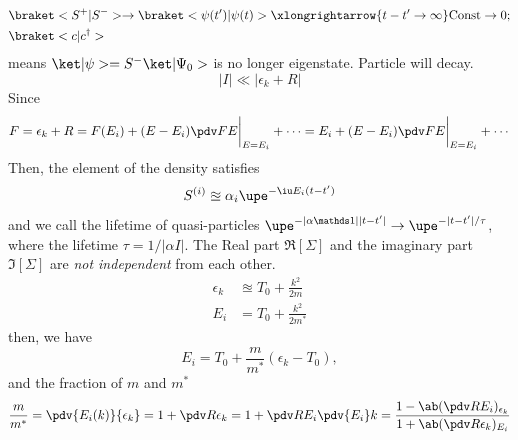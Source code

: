 \begin{align*}
  & \braket<S^+|S^-> \to \braket<\psi(t')|\psi(t)>
  \xlongrightarrow{t-t'\to\infty} \text{Const} \to 0;\\
  & \braket<c|c^\dagger>
\end{align*}
means $\ket|\psi> = S^-\ket|\Psi_0>$ is no longer eigenstate.
Particle will decay.
\[
  |I| \ll |\epsilon_k + R|
\]
Since
\[
  F = \epsilon_k + R
= F(E_i) + (E - E_i)\pdv FE\bigg|_{E=E_i} + \cdots
= E_i + (E - E_i)\pdv FE\bigg|_{E=E_i} + \cdots
\]
Then, the element of the density satisfies
\begin{equation}
  S^{(i)} \approxeq \alpha_i \upe^{-\iu E_i(t-t')}
\end{equation}
and we call the lifetime of quasi-particles $\upe^{-|\alpha \identity||t-t'|} \to \upe^{-|t-t'|/\tau}$, where the lifetime $\tau = 1/|\alpha I|$.
The Real part $\Re[\Sigma]$ and the imaginary part $\Im[\Sigma]$ are \emph{not independent} from each other.
\begin{align}
  \epsilon_k & \approxeq T_0 + \frac{k^2}{2m}\\
  E_i & = T_0 + \frac{k^2}{2m^*}
\end{align}
then, we have
\[
  E_i = T_0 + \frac m{m^*}(\epsilon_k - T_0),
\]
and the fraction of $m$ and $m^*$
\[
  \frac{m}{m^*} = \pdv{E_i(k)}{\epsilon_k} = 1 + \pdv R{\epsilon_k}
= 1 + \pdv R{E_i} \pdv{E_i}k
= \frac{1 - \ab(\pdv R{E_i})_{\epsilon_k}}{1 + \ab(\pdv R{\epsilon_k})_{E_i}}
\]